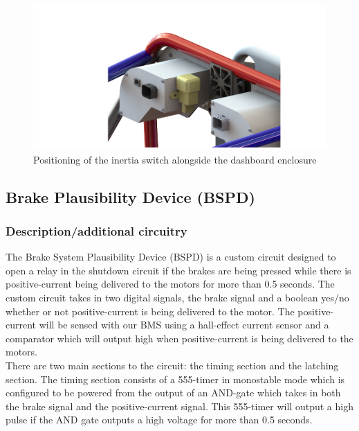 \documentclass{article}
\begin{document}
  \begin{figure}[H]
  \centering
  \includegraphics[width = 0.9 \textwidth]{ImpactSensor3-1-17}
  \caption{Positioning of the inertia switch alongside the dashboard enclosure}
  \label{fig:inertia_switch_mount}
  \end{figure}


\subsection{Brake Plausibility Device (BSPD)}\label{brake_plausibility_device}
\subsubsection{Description/additional circuitry}

The Brake System Plausibility Device (BSPD) is a custom circuit designed to open a relay in the shutdown circuit if the brakes are being pressed while there is positive-current being delivered to the motors for more than 0.5 seconds. The custom circuit takes in two digital signals, the brake signal and a boolean yes/no whether or not positive-current is being delivered to the motor. The positive-current will be sensed with our BMS using a hall-effect current sensor and a comparator which will output high when positive-current is being delivered to the motors. \\

There are two main sections to the circuit: the timing section and the latching section. The timing section consists of a 555-timer in monostable mode which is configured to be powered from the output of an AND-gate which takes in both the brake signal and the positive-current signal. This 555-timer will output a high pulse if the AND gate outputs a high voltage for more than 0.5 seconds. \\
\end{document}

